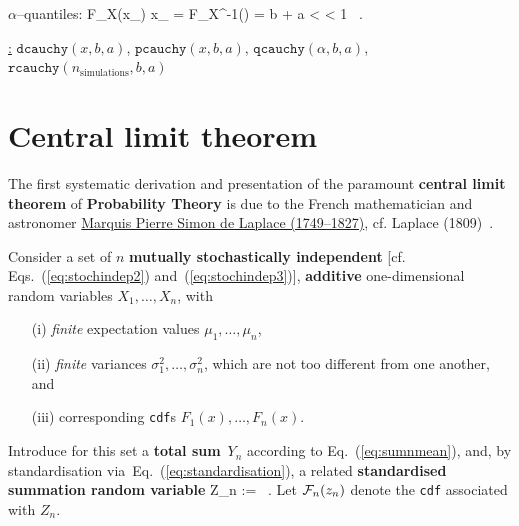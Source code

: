 \medskip
\noindent
$\alpha$--quantiles:
%
\be
\alpha \stackrel{!}{=} F_{X}(x_{\alpha})
\quad\Leftrightarrow\quad
x_{\alpha} = F_{X}^{-1}(\alpha)
= b + a\tan{}
\quad{} < \alpha < 1 \ .
\ee
%

\medskip
\noindent
\underline{\R:} $\texttt{dcauchy}(x,b,a)$,
$\texttt{pcauchy}(x,b,a)$, $\texttt{qcauchy}(\alpha,b,a)$,
$\texttt{rcauchy}(n_{\mathrm{simulations}},b,a)$

\section[Central limit theorem]{Central limit theorem}
The first systematic derivation and presentation of the paramount
\textbf{central limit theorem} of \textbf{Probability Theory} is
due to the French mathematician and astronomer 
\href{http://www-history.mcs.st-and.ac.uk/Biographies/Laplace.html}{Marquis Pierre Simon de Laplace (1749--1827)}, cf. Laplace 
(1809)~.

\medskip
\noindent
Consider a set of $n$ \textbf{mutually stochastically independent} 
[cf. Eqs.~(\ref{eq:stochindep2}) and~(\ref{eq:stochindep3})],
\textbf{additive} one-dimensional random variables
$X_{1},\ldots, X_{n}$, with
%
\begin{itemize}

\item[(i)] \textit{finite} expectation values 
$\mu_{1}, \ldots, \mu_{n}$,

\item[(ii)] \textit{finite} variances 
$\sigma_{1}^{2}, \ldots, \sigma_{n}^{2}$,
which are not too different from one another, and 

\item[(iii)] corresponding \texttt{cdf}s 
$F_{1}(x), \ldots, F_{n}(x)$.
\end{itemize}
%
Introduce for this set a \textbf{total sum}~$Y_{n}$ according to 
Eq.~(\ref{eq:sumnmean}), and, by standardisation 
via~Eq.~(\ref{eq:standardisation}), a related \textbf{standardised 
summation random variable}
%
\be
\displaystyle
Z_{n} := 
 \ .
\ee
%
Let ${\cal F}_{n}(z_{n})$ denote the \texttt{cdf} associated with
$Z_{n}$.

